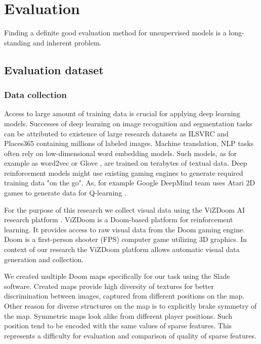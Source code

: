 
\chapter{Evaluation}
\label{ch:eval}

Finding a definite good evaluation method for unsupervised models is a long-standing and inherent problem.


\section{Evaluation dataset}
\subsection{Data collection}

Access to large amount of training data is crucial for applying deep learning models.
Successes of deep learning on image recognition and segmentation tasks can be attributed to existence of large research datasets as ILSVRC and Places365 \cite{ILSVRC15, Zhou2016} containing millions of labeled images.
Machine translation, NLP tasks \cite{Karpathy2014, Kim2014} often rely on low-dimensional word embedding models.
Such models, as for example as word2vec or Glove \cite{Mikolov2013, pennington2014glove}, are trained on terabytes of textual data.
Deep reinforcement models might use existing gaming engines to generate required training data "on the go".
As, for example Google DeepMind team uses Atari 2D games to generate data for Q-learning \cite{Mnih2013}.

For the purpose of this research we collect visual data using the ViZDoom AI research platform \cite{Kempka2016}.
ViZDoom is a Doom-based platform for reinforcement learning.
It provides access to raw visual data from the Doom gaming engine.
Doom is a first-person shooter (FPS) computer game utilizing 3D graphics.
In context of our research the ViZDoom platform allows automatic visual data generation and collection.

We created multiple Doom maps specifically for our task using the Slade \cite{Slade3} software.
Created maps provide high diversity of textures for better discrimination between images, captured from different positions on the map.
Other reason for diverse structures on the map is to explicitly brake symmetry of the map.
Symmetric maps look alike from different player positions.
Such position tend to be encoded with the same values of sparse features.
This represents a difficulty for evaluation and comparison of quality of sparse features.

